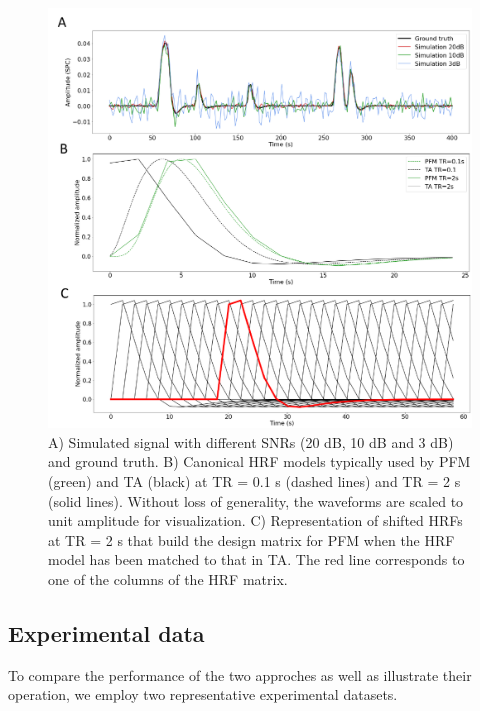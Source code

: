 \begin{figure}[H]
    \begin{center}
        \includegraphics[width=0.75\columnwidth]{figures/sim_and_hrf.pdf}
    \end{center}
    \caption{A) Simulated signal with different SNRs (20 dB, 10 dB and 3 dB) and ground truth. B) Canonical HRF models typically used by PFM (green) and TA (black) at TR = 0.1 s (dashed lines) and TR = 2 s (solid lines). Without loss of generality, the waveforms are scaled to unit amplitude for visualization. C) Representation of shifted HRFs at TR = 2 s that build the design matrix for PFM when the HRF model has been matched to that in TA. The red line corresponds to one of the columns of the HRF matrix.}
\label{fig:sim_and_hrf}
\end{figure}

\subsection{Experimental data}
To compare the performance of the two approches as well as illustrate their operation, we employ two representative experimental datasets.

